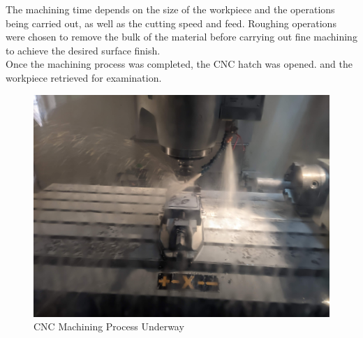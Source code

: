 The machining time depends on the  size of the workpiece and the operations being carried out, as well as the cutting speed and feed. Roughing operations were chosen to remove the bulk of the material before carrying out fine machining to achieve the desired surface finish.\\
Once the machining process was completed, the CNC hatch was opened. and the workpiece retrieved for examination.
\begin{figure}[h!]
	\centering
	\includegraphics[width=0.8\linewidth]{Figures/machining}
	\caption[CNC Machining Process]{CNC Machining Process Underway}
	\label{fig:machining}
\end{figure}
